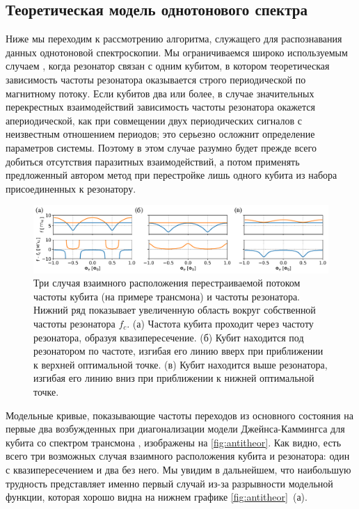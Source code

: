 \documentclass[14pt, a4paper]{extreport}
\numberwithin{equation}{section}
\begin{document}
\subsection{Теоретическая модель однотонового спектра}\label{sec:sts_theory}

Ниже мы переходим к рассмотрению алгоритма, служащего для распознавания данных однотоновой спектроскопии. Мы ограничиваемся широко используемым случаем \cite{kelly2015state, versluis2017}, когда резонатор связан с одним кубитом, в котором теоретическая зависимость частоты резонатора оказывается строго периодической по магнитному потоку. Если кубитов два или более, в случае значительных перекрестных взаимодействий зависимость частоты резонатора окажется апериодической, как при совмещении двух периодических сигналов с неизвестным отношением периодов; это серьезно осложнит определение параметров системы. Поэтому в этом случае разумно будет прежде всего добиться отсутствия паразитных взаимодействий, а потом применять предложенный автором метод при перестройке лишь одного кубита из набора присоединенных к резонатору.

\begin{figure}
	\includegraphics[width=1\linewidth]{Pictures/anti_theor}
	\caption{Три случая взаимного расположения перестраиваемой потоком частоты кубита (на примере трансмона) и частоты резонатора. Нижний ряд показывает увеличенную область вокруг собственной частоты резонатора $f_c$. (а) Частота кубита проходит через частоту резонатора, образуя квазипересечение. (б) Кубит находится под резонатором по частоте, изгибая его линию вверх при приближении к верхней оптимальной точке. (в) Кубит находится выше резонатора, изгибая его линию вниз при приближении к нижней оптимальной точке.}
	\label{fig:antitheor}
\end{figure}

Модельные кривые, показывающие частоты переходов из основного состояния на первые два возбужденных при диагонализации модели Джейнса-Каммингса для кубита со спектром трансмона \cite{blais2004cavity, koch2007charge, filipp2011multimode}, изображены на \autoref{fig:antitheor}. Как видно, есть всего три возможных случая взаимного расположения кубита и резонатора: один с квазипересечением и два без него. Мы увидим в дальнейшем, что наибольшую трудность представляет именно первый случай из-за разрывности модельной функции, которая хорошо видна на нижнем графике \autoref{fig:antitheor}~(а).
\end{document}
